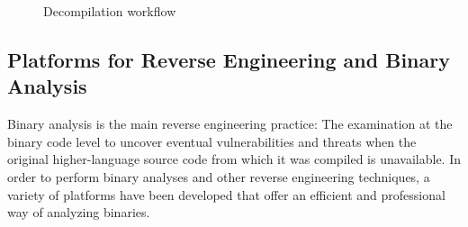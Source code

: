 \documentclass[seminar]{plai}
\begin{document}
\begin{figure}[htbp]
\centering
{}
\caption{Decompilation workflow\cite{reverse-engineering-vs-disassembly}}
\label{fig:interpret-bytecode}
\end{figure}


\subsection{Platforms for Reverse Engineering and Binary Analysis}
\label{sec:platforms-for-reverse-engineering-binaryAnalysis-background}
Binary analysis is the main reverse engineering practice: The examination at the binary code level to uncover eventual vulnerabilities and threats when the original higher-language source code from which it was compiled is unavailable.
In order to perform binary analyses and other reverse engineering techniques, a variety of platforms have been developed that offer an efficient and professional way of analyzing binaries.
\end{document}
